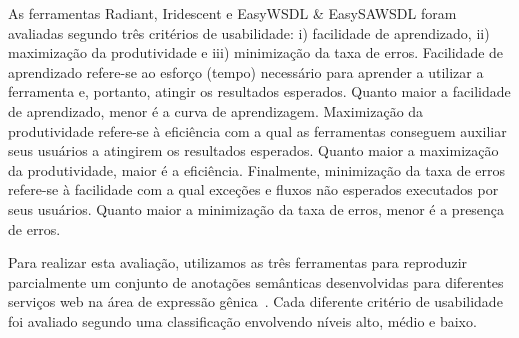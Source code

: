 

As ferramentas Radiant, Iridescent e EasyWSDL \& EasySAWSDL foram avaliadas segundo três critérios de usabilidade: i) facilidade de aprendizado, ii) maximização da produtividade e iii) minimização da taxa de erros. Facilidade de aprendizado refere-se ao esforço (tempo) necessário para aprender a utilizar a ferramenta e, portanto, atingir os resultados esperados. Quanto maior a facilidade de aprendizado, menor é a curva de aprendizagem. Maximização da produtividade refere-se à eficiência com a qual as ferramentas conseguem auxiliar seus usuários a atingirem os resultados esperados. Quanto maior a maximização da produtividade, maior é a eficiência. Finalmente, minimização da taxa de erros refere-se à facilidade com a qual exceções e fluxos não esperados executados por seus usuários. Quanto maior a minimização da taxa de erros, menor é a presença de erros.

Para realizar esta avaliação, utilizamos as três ferramentas para reproduzir parcialmente um conjunto de anotações semânticas desenvolvidas para diferentes serviços web na área de expressão gênica~\cite{GUARDIA-FARIAS-2017-SemantiSCo}. Cada diferente critério de usabilidade foi avaliado segundo uma classificação envolvendo níveis alto, médio e baixo.


